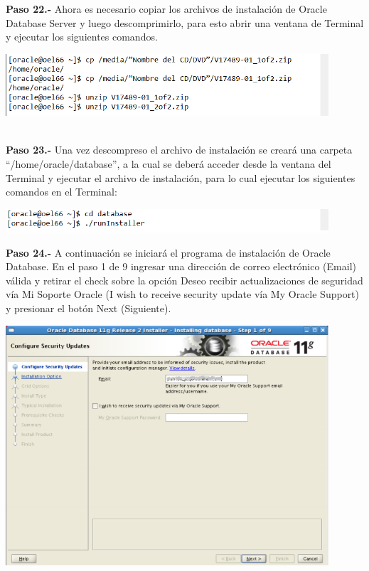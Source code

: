 \begin{enumerate}
\textbf {Paso 22.-} Ahora es necesario copiar los archivos de instalación de Oracle Database Server y luego descomprimirlo, para esto abrir una ventana de Terminal y ejecutar los siguientes comandos.

\begin{center}
  \includegraphics[width=12cm]{Imagenes/Oracle_Database/Paso_22.png}
\end{center}
\vspace{12pt}\\

\textbf {Paso 23.-} Una vez descompreso el archivo de instalación se creará una carpeta “/home/oracle/database”, a la cual se deberá acceder desde la ventana del Terminal y ejecutar el archivo de instalación, para lo cual ejecutar los siguientes comandos en el Terminal:

\begin{center}
  \includegraphics[width=12cm]{Imagenes/Oracle_Database/Paso_23.png}
\end{center}
\break

\textbf {Paso 24.-} A continuación se iniciará el programa de instalación de Oracle Database. En el paso 1 de 9 ingresar una dirección de correo electrónico (Email) válida y retirar el check sobre la opción Deseo recibir actualizaciones de seguridad vía Mi Soporte Oracle (I wish to receive security update vía My Oracle Support) y presionar el botón Next (Siguiente).

\begin{center}
  \includegraphics[width=12cm]{Imagenes/Oracle_Database/Paso_24.png}
\end{center}
\vspace{12pt}\\


\end{enumerate}
